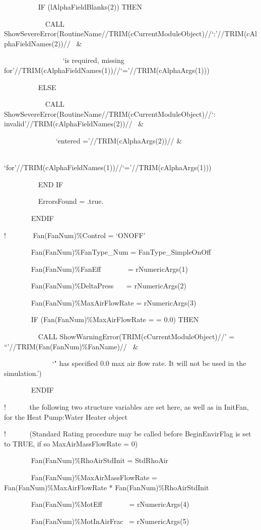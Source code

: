 ~~~~~~~~~ IF (lAlphaFieldBlanks(2)) THEN

~~~~~~~~~~~ CALL ShowSevereError(RoutineName//TRIM(cCurrentModuleObject)//`:'//TRIM(cAlphaFieldNames(2))//~ \&

~~~~~~~~~~~~~~ ~~`is required, missing for'//TRIM(cAlphaFieldNames(1))//`='//TRIM(cAlphaArgs(1)))

~~~~~~~~~ ELSE

~~~~~~~~~~~ CALL ShowSevereError(RoutineName//TRIM(cCurrentModuleObject)//`: invalid'//TRIM(cAlphaFieldNames(2))//~ \&

~~~~~~~~~~~~~~ `entered ='//TRIM(cAlphaArgs(2))// \&

~~~~~~~~~~~~~~ `for'//TRIM(cAlphaFieldNames(1))//`='//TRIM(cAlphaArgs(1)))

~~~~~~~~~ END IF

~~~~~~~~~ ErrorsFound = .true.

~~~~~~~ ENDIF

!~~~~~~~ Fan(FanNum)\%Control = `ONOFF'

~~~~~~~ Fan(FanNum)\%FanType\_Num = FanType\_SimpleOnOff

~~~~~~~ Fan(FanNum)\%FanEff~~~~~~~ = rNumericArgs(1)

~~~~~~~ Fan(FanNum)\%DeltaPress~~~ = rNumericArgs(2)

~~~~~~~ Fan(FanNum)\%MaxAirFlowRate = rNumericArgs(3)

~~~~~~~ IF (Fan(FanNum)\%MaxAirFlowRate = = 0.0) THEN

~~~~~~~~~ CALL ShowWarningError(TRIM(cCurrentModuleObject)//' = ``'//TRIM(Fan(FanNum)\%FanName)//~ \&

~~~~~~~~~~~~~ `" has specified 0.0 max air flow rate. It will not be used in the simulation.')

~~~~~~~ ENDIF

!~~~~~~ the following two structure variables are set here, as well as in InitFan, for the Heat Pump:Water Heater object

!~~~~~~ (Standard Rating procedure may be called before BeginEnvirFlag is set to TRUE, if so MaxAirMassFlowRate = 0)

~~~~~~~ Fan(FanNum)\%RhoAirStdInit = StdRhoAir

~~~~~~~ Fan(FanNum)\%MaxAirMassFlowRate = Fan(FanNum)\%MaxAirFlowRate * Fan(FanNum)\%RhoAirStdInit

~~~~~~~ Fan(FanNum)\%MotEff~~~~~~~ = rNumericArgs(4)

~~~~~~~ Fan(FanNum)\%MotInAirFrac~ = rNumericArgs(5)

